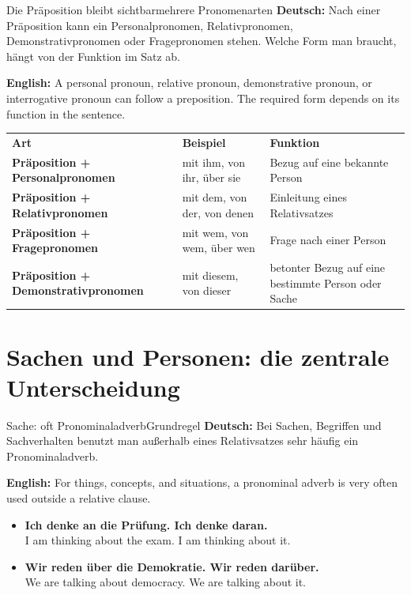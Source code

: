 \documentclass[a4paper,11pt]{article}
\newcommand{\GermanText}[1]{\textbf{Deutsch: }#1\par}
\newcommand{\EnglishText}[1]{{\small\color{SoftGray}\textbf{English: }#1\par}}
\newcommand{\ExampleItem}[2]{\item \textbf{#1}\\{\small\color{SoftGray}#2}}
\begin{document}
        \begin{grammarentry}{Die Präposition bleibt sichtbar}{mehrere Pronomenarten}
            \GermanText{Nach einer Präposition kann ein Personalpronomen, Relativpronomen, Demonstrativpronomen oder Fragepronomen stehen. Welche Form man braucht, hängt von der Funktion im Satz ab.}
            \EnglishText{A personal pronoun, relative pronoun, demonstrative pronoun, or interrogative pronoun can follow a preposition. The required form depends on its function in the sentence.}
        \end{grammarentry}

        \begin{longtable}{>{\bfseries}p{3.5cm}|p{4.3cm}|p{5.8cm}}
            \rowcolor{HeaderBlueDark}
            \color{white}\textbf{Art} &
            \color{white}\textbf{Beispiel} &
            \color{white}\textbf{Funktion} \\
            Präposition + Personalpronomen & mit ihm, von ihr, über sie & Bezug auf eine bekannte Person \\
            Präposition + Relativpronomen & mit dem, von der, von denen & Einleitung eines Relativsatzes \\
            Präposition + Fragepronomen & mit wem, von wem, über wen & Frage nach einer Person \\
            Präposition + Demonstrativpronomen & mit diesem, von dieser & betonter Bezug auf eine bestimmte Person oder Sache \\
        \end{longtable}

    \section{Sachen und Personen: die zentrale Unterscheidung}

        \begin{grammarentry}{Sache: oft Pronominaladverb}{Grundregel}
            \GermanText{Bei Sachen, Begriffen und Sachverhalten benutzt man außerhalb eines Relativsatzes sehr häufig ein Pronominaladverb.}
            \EnglishText{For things, concepts, and situations, a pronominal adverb is very often used outside a relative clause.}
        \end{grammarentry}

        \begin{exbox}
            \begin{itemize}
                \ExampleItem{Ich denke an die Prüfung. Ich denke daran.}{I am thinking about the exam. I am thinking about it.}
                \ExampleItem{Wir reden über die Demokratie. Wir reden darüber.}{We are talking about democracy. We are talking about it.}
            \end{itemize}
        \end{exbox}
\end{document}
